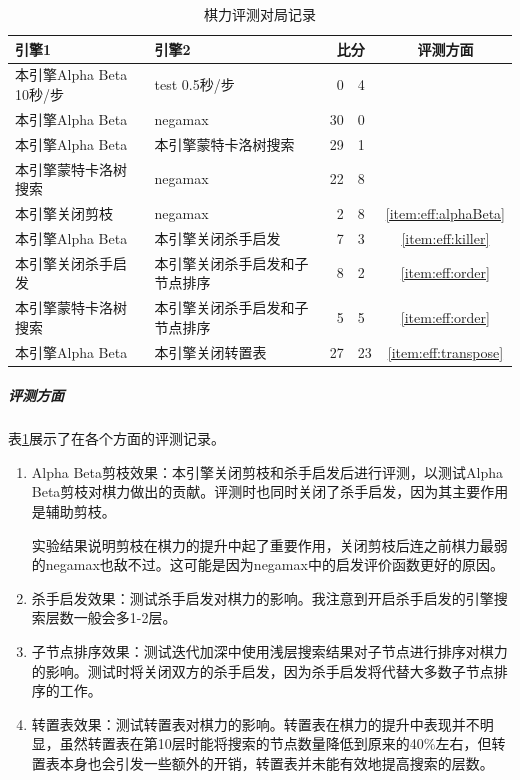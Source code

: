 \documentclass{ctexart}
\begin{document}
\begin{table}
    \centering
    \begin{tabular}{l l | r @{:} l | c}
        \textbf{引擎1} & \textbf{引擎2} & \multicolumn{2}{c|}{\textbf{比分}} & \textbf{评测方面} \\
        \hline
        本引擎Alpha Beta 10秒/步 & test 0.5秒/步 & 0 & 4\\
        本引擎Alpha Beta & negamax & 30 & 0\\
        本引擎Alpha Beta & 本引擎蒙特卡洛树搜索 & 29 & 1\\
        本引擎蒙特卡洛树搜索 & negamax & 22 & 8\\
        本引擎关闭剪枝 & negamax & 2 & 8 & \ref{item:eff:alphaBeta}\\
        本引擎Alpha Beta & 本引擎关闭杀手启发 & 7 & 3 & \ref{item:eff:killer}\\
        本引擎关闭杀手启发 & 本引擎关闭杀手启发和子节点排序 & 8 & 2 & \ref{item:eff:order}\\
        本引擎蒙特卡洛树搜索 & 本引擎关闭杀手启发和子节点排序 & 5 & 5 & \ref{item:eff:order}\\
        本引擎Alpha Beta & 本引擎关闭转置表 & 27 & 23 & \ref{item:eff:transpose}\\
    \end{tabular}
    \caption{棋力评测对局记录}
    \label{table:battleRecord}
\end{table}

\subparagraph{评测方面} 表\ref{table:battleRecord}展示了在各个方面的评测记录。
\begin{enumerate}
    \item \label{item:eff:alphaBeta} Alpha Beta剪枝效果：本引擎关闭剪枝和杀手启发后进行评测，以测试Alpha Beta剪枝对棋力做出的贡献。评测时也同时关闭了杀手启发，因为其主要作用是辅助剪枝。
    
    实验结果说明剪枝在棋力的提升中起了重要作用，关闭剪枝后连之前棋力最弱的negamax也敌不过。这可能是因为negamax中的启发评价函数更好的原因。

    \item \label{item:eff:killer} 杀手启发效果：测试杀手启发对棋力的影响。我注意到开启杀手启发的引擎搜索层数一般会多1-2层。
    \item \label{item:eff:order} 子节点排序效果：测试迭代加深中使用浅层搜索结果对子节点进行排序对棋力的影响。测试时将关闭双方的杀手启发，因为杀手启发将代替大多数子节点排序的工作。
    \item \label{item:eff:transpose} 转置表效果：测试转置表对棋力的影响。转置表在棋力的提升中表现并不明显，虽然转置表在第10层时能将搜索的节点数量降低到原来的40\%左右，但转置表本身也会引发一些额外的开销，转置表并未能有效地提高搜索的层数。
\end{enumerate}
\end{document}
